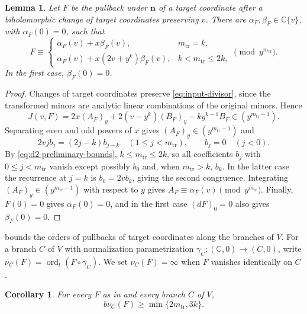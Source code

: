 \documentclass[11pt,letterpaper]{article}
\numberwithin{equation}{section}
\newtheorem{lemma}[lemma]{Lemma}
\newtheorem{corollary}[corollary]{Corollary}
\theoremstyle{remark}
\theoremstyle{plain}
\newcommand{\C}{\mathbb{C}}
\newcommand{\ord}{\operatorname{ord}}
\begin{document}
\begin{lemma}
\label{lem:d2-recurrence}
Let $F$ be the pullback under $\boldsymbol n$ of a target coordinate
after a biholomorphic change of target coordinates preserving $v$.
There are $\alpha_F,\beta_F\in\C\{v\}$, with $\alpha_F(0)=0$, such that
\begin{equation}
 F\equiv
 \begin{cases}
  \alpha_F(v)+x\beta_F(v),&m_{\mathrm{tr}}=k,\\
  \alpha_F(v)+x(2v+y^k)\beta_F(v),&k<m_{\mathrm{tr}}\leq2k,
 \end{cases}
 \pmod{y^{m_{\mathrm{tr}}}}.
 \label{eq:d2-A}
\end{equation}
In the first case, $\beta_F(0)=0$.
\end{lemma}

\begin{proof}
Changes of target coordinates preserve \eqref{eq:input-divisor},
since the transformed minors are analytic linear combinations
of the original minors.  Hence
\[
 J(v,F)=2x(A_F)_y+2(v-y^k)(B_F)_y-ky^{k-1}B_F
 \in(y^{m_{\mathrm{tr}}-1}).
\]
Separating even and odd powers of $x$ gives
$(A_F)_y\in(y^{m_{\mathrm{tr}}-1})$ and
\[
 2vjb_j=(2j-k)b_{j-k}\quad(1\leq j<m_{\mathrm{tr}}),
 \qquad b_j=0\quad(j<0).
\]
By \eqref{eq:d2-preliminary-bounds}, $k\leq m_{\mathrm{tr}}\leq2k$,
so all coefficients $b_j$ with
$0\leq j<m_{\mathrm{tr}}$ vanish except possibly $b_0$ and, when
$m_{\mathrm{tr}}>k$, $b_k$.  In the latter case the recurrence at $j=k$
is $b_0=2vb_k$, giving the second congruence.
Integrating $(A_F)_y\in(y^{m_{\mathrm{tr}}-1})$ with respect to $y$ gives
$A_F\equiv\alpha_F(v)\pmod{y^{m_{\mathrm{tr}}}}$.
Finally, $F(0)=0$ gives $\alpha_F(0)=0$, and in the first case
$(dF)_0=0$ also gives $\beta_F(0)=0$.
\end{proof}

 bounds the orders of pullbacks of target
coordinates along the branches of $V$.  For a branch $C$ of
$V$ with normalization parametrization $\gamma_C:(\C,0)\to(C,0)$,
write $\nu_C(F)=\ord_t(F\circ\gamma_C)$.
We set $\nu_C(F)=\infty$ when $F$ vanishes identically on $C$.

\begin{corollary}
\label{cor:d2-branch-orders}
For every $F$ as in  and every branch $C$ of $V$,
\begin{equation}
 b\nu_C(F)\geq\min\{2m_{\mathrm{tr}},3k\}.
 \label{eq:d2-branch-orders}
\end{equation}
\end{corollary}
\end{document}
